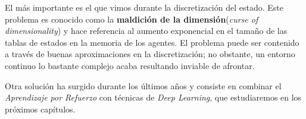 El más importante es el que vimos durante la discretización del estado. Este problema es conocido como la \textbf{maldición de la dimensión}(\textit{curse of dimensionality}) y hace referencia al aumento exponencial en el tamaño de las tablas de estados en la memoria de los agentes. El problema puede ser contenido a través de buenas aproximaciones en la discretización; no obstante, un entorno continuo lo bastante complejo acaba resultando inviable de afrontar.

Otra solución ha surgido durante los últimos años y consiste en combinar el \textit{Aprendizaje por Refuerzo} con técnicas de \textit{Deep Learning}, que estudiaremos en los próximos capítulos.
